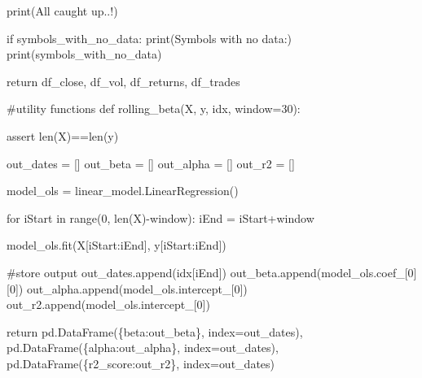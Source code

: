 \documentclass[
  letterpaper,
  DIV=11,
  numbers=noendperiod]{scrartcl}
\newenvironment{Shaded}{\begin{snugshade}}{\end{snugshade}}
\newcommand{\BuiltInTok}[1]{\textcolor[rgb]{0.00,0.23,0.31}{#1}}
\newcommand{\CommentTok}[1]{\textcolor[rgb]{0.37,0.37,0.37}{#1}}
\newcommand{\ControlFlowTok}[1]{\textcolor[rgb]{0.00,0.23,0.31}{#1}}
\newcommand{\DecValTok}[1]{\textcolor[rgb]{0.68,0.00,0.00}{#1}}
\newcommand{\KeywordTok}[1]{\textcolor[rgb]{0.00,0.23,0.31}{#1}}
\newcommand{\NormalTok}[1]{\textcolor[rgb]{0.00,0.23,0.31}{#1}}
\newcommand{\OperatorTok}[1]{\textcolor[rgb]{0.37,0.37,0.37}{#1}}
\newcommand{\StringTok}[1]{\textcolor[rgb]{0.13,0.47,0.30}{#1}}
\begin{document}
\begin{Shaded}
\begin{Highlighting}[]
    \BuiltInTok{print}\NormalTok{(}\StringTok{\textquotesingle{}All caught up..!\textquotesingle{}}\NormalTok{)}
    
    \ControlFlowTok{if}\NormalTok{ symbols\_with\_no\_data:}
        \BuiltInTok{print}\NormalTok{(}\StringTok{\textquotesingle{}Symbols with no data:\textquotesingle{}}\NormalTok{)}
        \BuiltInTok{print}\NormalTok{(symbols\_with\_no\_data)}

    \ControlFlowTok{return}\NormalTok{ df\_close, df\_vol, df\_returns, df\_trades}

\end{Highlighting}
\end{Shaded}

\begin{Shaded}
\begin{Highlighting}[]
\CommentTok{\#utility functions}
\KeywordTok{def}\NormalTok{ rolling\_beta(X, y, idx, window}\OperatorTok{=}\DecValTok{30}\NormalTok{):}

    \ControlFlowTok{assert} \BuiltInTok{len}\NormalTok{(X)}\OperatorTok{==}\BuiltInTok{len}\NormalTok{(y)}

\NormalTok{    out\_dates }\OperatorTok{=}\NormalTok{ []}
\NormalTok{    out\_beta }\OperatorTok{=}\NormalTok{ []}
\NormalTok{    out\_alpha }\OperatorTok{=}\NormalTok{ []}
\NormalTok{    out\_r2 }\OperatorTok{=}\NormalTok{ []}

\NormalTok{    model\_ols }\OperatorTok{=}\NormalTok{ linear\_model.LinearRegression()}

    \ControlFlowTok{for}\NormalTok{ iStart }\KeywordTok{in} \BuiltInTok{range}\NormalTok{(}\DecValTok{0}\NormalTok{, }\BuiltInTok{len}\NormalTok{(X)}\OperatorTok{{-}}\NormalTok{window):        }
\NormalTok{        iEnd }\OperatorTok{=}\NormalTok{ iStart}\OperatorTok{+}\NormalTok{window}

\NormalTok{        model\_ols.fit(X[iStart:iEnd], y[iStart:iEnd])}

        \CommentTok{\#store output}
\NormalTok{        out\_dates.append(idx[iEnd])}
\NormalTok{        out\_beta.append(model\_ols.coef\_[}\DecValTok{0}\NormalTok{][}\DecValTok{0}\NormalTok{])}
\NormalTok{        out\_alpha.append(model\_ols.intercept\_[}\DecValTok{0}\NormalTok{])}
\NormalTok{        out\_r2.append(model\_ols.intercept\_[}\DecValTok{0}\NormalTok{])}

    \ControlFlowTok{return}\NormalTok{ pd.DataFrame(\{}\StringTok{\textquotesingle{}beta\textquotesingle{}}\NormalTok{:out\_beta\}, index}\OperatorTok{=}\NormalTok{out\_dates), pd.DataFrame(\{}\StringTok{\textquotesingle{}alpha\textquotesingle{}}\NormalTok{:out\_alpha\}, index}\OperatorTok{=}\NormalTok{out\_dates), pd.DataFrame(\{}\StringTok{\textquotesingle{}r2\_score\textquotesingle{}}\NormalTok{:out\_r2\}, index}\OperatorTok{=}\NormalTok{out\_dates)}
\end{Highlighting}
\end{Shaded}
\end{document}
